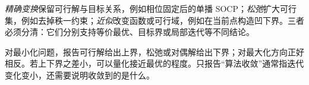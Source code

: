 \emph{精确变换}保留可行解与目标关系，例如相位固定后的单播 SOCP；\emph{松弛}扩大可行集，例如去掉秩一约束；\emph{近似}改变函数或可行域，例如在当前点构造凹下界。三者必须分清：它们分别支持等价最优、目标界或局部迭代等不同结论。

对最小化问题，报告可行解给出上界，松弛或对偶解给出下界；对最大化方向正好相反。若上下界之差小，可以量化接近最优的程度。只报告“算法收敛”通常指迭代变化变小，还需要说明收敛到的是什么。

